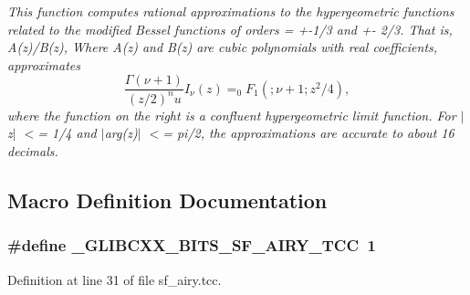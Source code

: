\begin{DoxyCompactItemize}
\begin{DoxyCompactList}\small\item\em This function computes rational approximations to the hypergeometric functions related to the modified Bessel functions of orders  = +-\/1/3 and  +-\/ 2/3. That is, A(z)/\+B(z), Where A(z) and B(z) are cubic polynomials with real coefficients, approximates \[ \frac{\Gamma(\nu+1)}{(z/2)^nu}I_\nu(z) = _0F_1 (;\nu+1;z^2/4), \] where the function on the right is a confluent hypergeometric limit function. For $\vert$z$\vert$ $<$= 1/4 and $\vert$arg(z)$\vert$ $<$= pi/2, the approximations are accurate to about 16 decimals. \end{DoxyCompactList}\end{DoxyCompactItemize}


\subsection{Macro Definition Documentation}
\hypertarget{sf__airy_8tcc_a2368d5b1edfb2e14f2c283d87ab89943}{}
\subsubsection[{\+\_\+\+G\+L\+I\+B\+C\+X\+X\+\_\+\+B\+I\+T\+S\+\_\+\+S\+F\+\_\+\+A\+I\+R\+Y\+\_\+\+T\+C\+C}]{\setlength{\rightskip}{0pt plus 5cm}\#define \+\_\+\+G\+L\+I\+B\+C\+X\+X\+\_\+\+B\+I\+T\+S\+\_\+\+S\+F\+\_\+\+A\+I\+R\+Y\+\_\+\+T\+C\+C~1}\label{sf__airy_8tcc_a2368d5b1edfb2e14f2c283d87ab89943}


Definition at line 31 of file sf\+\_\+airy.\+tcc.

